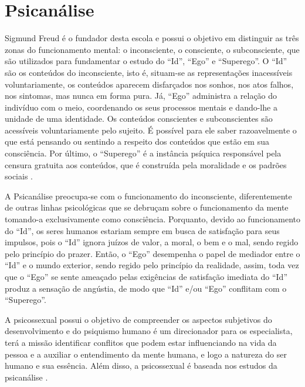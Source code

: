 \newpage
\section{Psicanálise}\label{psicanalise}

Sigmund Freud é o fundador desta escola e possui o objetivo em distinguir as três zonas do funcionamento mental: o inconsciente, o consciente, o subconsciente, que são utilizados para fundamentar o estudo do ``Id'', ``Ego'' e ``Superego''. 
O ``Id'' são os conteúdos do inconsciente, isto é, situam-se as representações inacessíveis voluntariamente, os conteúdos aparecem disfarçados nos sonhos, nos atos falhos, nos sintomas, mas nunca em forma pura. 
Já, ``Ego'' administra a relação do indivíduo com o meio, coordenando os seus processos mentais e dando-lhe a unidade de uma identidade. Os conteúdos conscientes e subconscientes são acessíveis voluntariamente pelo sujeito. É possível para ele saber razoavelmente o que está pensando ou sentindo a respeito dos conteúdos que estão em sua consciência.
Por último, o ``Superego'' é a instância psíquica responsável pela censura gratuita aos conteúdos, que é construída pela moralidade e os padrões sociais \cite{silva2007psicologia_educacao}.

A Psicanálise preocupa-se com o funcionamento do inconsciente, diferentemente de outras linhas psicológicas que se debruçam sobre o funcionamento da mente tomando-a exclusivamente como consciência.
Porquanto, devido ao funcionamento do ``Id'', os seres humanos estariam sempre em busca de satisfação para seus impulsos, pois o ``Id'' ignora juízos de valor, a moral, o bem e o mal, sendo regido pelo princípio do prazer.
Então, o ``Ego'' desempenha o papel de mediador entre o ``Id'' e o mundo exterior, sendo regido pelo
princípio da realidade, assim, toda vez que o ``Ego'' se sente ameaçado pelas exigências de satisfação
imediata do ``Id'' produz a sensação de angústia, de modo que  ``Id'' e/ou ``Ego'' conflitam com o ``Superego''.

A psicossexual possui o objetivo de compreender os aspectos subjetivos do desenvolvimento e do psiquismo humano é um direcionador para os especialista, terá a missão identificar conflitos que podem estar influenciando na vida da pessoa e a auxiliar o entendimento da mente humana, e logo a natureza do ser humano e sua essência.
Além disso, a psicossexual é baseada nos estudos da psicanálise \cite{silva2007psicologia_educacao}. 
